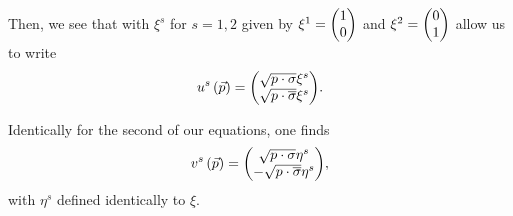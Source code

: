 Then, we see that with $\xi^{s}$ for $s = 1,2$ given by $\xi^{1} = \mqty( 1 \\ 0 )$ and $\xi^{2} = \mqty( 0 \\ 1)$ allow us to write
\begin{align}
    u^{s}\left( \vec{p} \right) = \mqty( \sqrt{p \cdot \sigma} \xi^{s} \\ \sqrt{p \cdot \overline{\sigma}}  \xi^{s} )
.\end{align}

Identically for the second of our equations, one finds
\begin{align}
    v^{s}\left( \vec{p} \right) = \mqty( \sqrt{p \cdot \sigma}  \eta^{s} \\ - \sqrt{p \cdot \overline{\sigma}} \eta^{s} ) 
,\end{align}
with $\eta^{s}$ defined identically to $\xi$.




